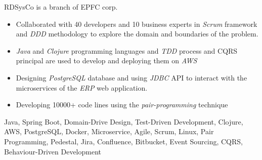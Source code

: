 \begin{experiences}
{
 \vspace{1 pt} \newline 
RDSysCo is a branch of EPFC corp. 
                    \begin{itemize}
                       \item Collaborated with 40 developers and 10 business experts in  \emph{Scrum} framework and \emph{DDD} methodology to explore the domain and boundaries of the problem.
                       \item \emph{Java} and \emph{Clojure} programming languages and \emph{TDD} process and CQRS principal are used to develop  and deploying them on \emph{AWS} 
                       \item Designing \emph{PostgreSQL} database and using \emph {JDBC} API to interact with the microservices of the \textit{ERP} web application.
                        \item Developing 10000+ code lines using the \emph{pair-programming} technique
                      \end{itemize}}
{Java, Spring Boot, Domain-Drive Design, Test-Driven Development, Clojure, AWS, PostgreSQL, Docker, Microservice, Agile, Scrum, Linux, Pair Programming, Pedestal, Jira, Confluence, Bitbucket, Event Sourcing, CQRS, Behaviour-Driven Development}


\end{experiences}
